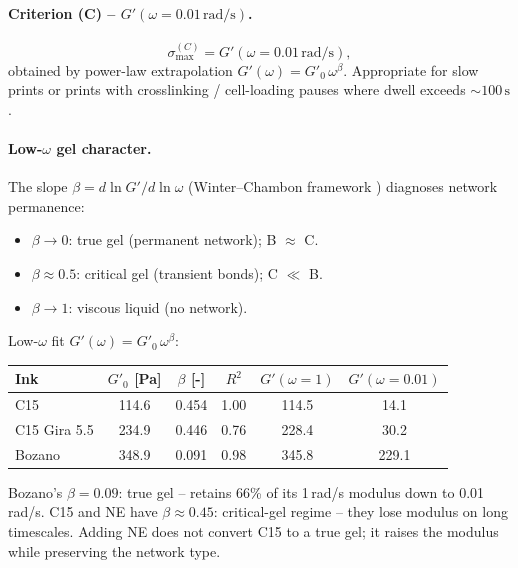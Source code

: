 \documentclass[11pt,a4paper]{article}
\begin{document}
\paragraph{Criterion (C) -- $G'(\omega=0.01\,\si{\radian\per\s})$.}
\begin{equation}
\sigma_\mathrm{max}^{(C)} = G'(\omega=0.01\,\si{\radian\per\s}),
\label{eq:sigmaC}
\end{equation}
obtained by power-law extrapolation $G'(\omega)=G'_0\,\omega^\beta$.
Appropriate for slow prints or prints with crosslinking / cell-loading
pauses where dwell exceeds $\sim 100\,\si{\s}$.

\paragraph{Low-$\omega$ gel character.}
The slope $\beta=d\ln G'/d\ln\omega$ (Winter--Chambon framework
\citealt{WinterChambon1987}) diagnoses network permanence:
\begin{itemize}[leftmargin=1.6em,itemsep=1pt]
\item $\beta\to 0$: true gel (permanent network); B $\approx$ C.
\item $\beta\approx 0.5$: critical gel (transient bonds); C $\ll$ B.
\item $\beta\to 1$: viscous liquid (no network).
\end{itemize}

\begin{examplebox}
Low-$\omega$ fit $G'(\omega)=G'_0\,\omega^\beta$:

\medskip\centering
\begin{tabular}{lccccc}
\toprule
Ink & $G'_0$ [\si{\Pa}] & $\beta$ [-] & $R^2$ & $G'(\omega=1)$ & $G'(\omega=0.01)$ \\
\midrule
C15           & 114.6 & 0.454 & 1.00 & 114.5 & 14.1  \\
C15 Gira 5.5  & 234.9 & 0.446 & 0.76 & 228.4 & 30.2  \\
Bozano        & 348.9 & 0.091 & 0.98 & 345.8 & 229.1 \\
\bottomrule
\end{tabular}

\medskip\flushleft
Bozano's $\beta=0.09$: true gel -- retains 66\% of its 1\,\si{\radian/s}
modulus down to 0.01\,\si{\radian/s}. C15 and NE have $\beta\approx
0.45$: critical-gel regime -- they lose modulus on long timescales.
Adding NE does not convert C15 to a true gel; it raises the modulus
while preserving the network type.
\end{examplebox}
\end{document}
